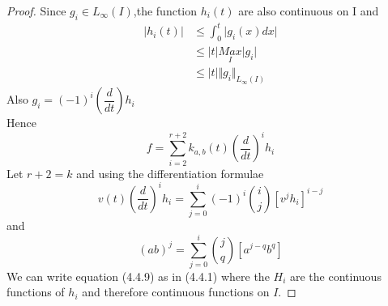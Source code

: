\begin{proof}
Since $g_{i}\in L_{\infty}(I)$,the function $h_{i}(t)$ are also continuous on I and 
\begin{align*}
\vert h_{i}(t)\vert &\leq \int_{0}^{t}\vert g_{i}(x)dx\vert\\
&\leq \vert t \vert \underset{I}{Max}\vert g_{i}\vert\\
&\leq \vert t \vert \Vert g_{i}\Vert_{L_{\infty}(I)} 
\end{align*}
 Also $g_{i} = (-1)^{i}(\dfrac{d}{dt})h_{i}$\\
Hence
\begin{equation}
f = \sum_{i=2}^{r+2}k_{a,b}(t)(\dfrac{d}{dt})^{i}h_{i} 
\end{equation}
Let $r+2 = k$ and using the differentiation formulae
\begin{equation}
v(t)(\dfrac{d}{dt})^{i}h_{i} = \sum_{j=0}^{i}(-1)^{i}\binom{i}{j}[v^{j}h_{i}]^{i-j} 
\end{equation}
and\begin{equation}
(ab)^{j}= \sum_{j=0}^{i}\binom{j}{q}[a^{j-q}b^{q}]
\end{equation} 
We can write equation (4.4.9) as in (4.4.1) where the $H_{i}$ are the continuous functions of $h_{i}$ and therefore continuous functions on $I$.
\end{proof}


